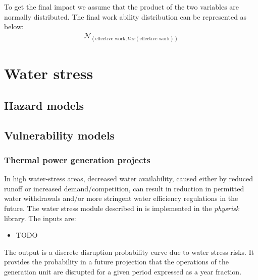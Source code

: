 \documentclass[a4paper,11pt]{extarticle} %
\theoremstyle{definition}
\begin{document}
To get the final impact we assume that the product of the two variables are normally distributed. The final work ability distribution can be represented as below:
\begin{equation}
\begin{aligned}
    \label{Eq:Final_Result_Heat}
     \mathcal{N}_{\left(\text{effective work}, Var\left(\text{effective work}\right)\right)}
      \end{aligned}
\end{equation}
\setcounter{secnumdepth}{3}

\section{Water stress}
\subsection{Hazard models}
\subsection{Vulnerability models}
\subsubsection{Thermal power generation projects}
In high water-stress areas, decreased water availability, caused either by reduced runoff or increased demand/competition, can result in reduction in permitted water withdrawals and/or more stringent water efficiency regulations in the future. The water stress module described in \cite{LuoEtAl:2021,LuoEtAl:2023} is implemented in the \emph{physrisk} library. The inputs are:
\begin{itemize}
\item TODO
\end{itemize}
The output is a discrete disruption probability curve due to water stress risks. It provides the probability in a future projection that the operations of the generation unit are disrupted for a given period expressed as a year fraction.

\clearpage
\printglossaries
\clearpage


%

%
\end{document}

